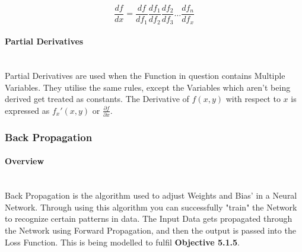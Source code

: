 \begin{flushleft}
                    \[
                        \frac{df}{dx} = \frac{df}{df_{1}} \frac{df_{1}}{df_{2}} \frac{df_{2}}{df_{3}} \hdots \frac{df_{n}}{df_{x}}
                    \]

                \paragraph{Partial Derivatives}  \mbox{} \\
                    \vspace{0.2cm}
                    Partial Derivatives are used when the Function in question contains Multiple Variables. They utilise the same rules, except the Variables
                    which aren't being derived get treated as constants. The Derivative of $f(x, y)$ with respect to $x$ is expressed as $f_{x}'(x,y)$ or 
                    {\Large $\frac{\partial f}{\partial x}$}. 
            \subsubsection{Back Propagation}
                \paragraph*{Overview} \mbox{} \\
                    Back Propagation is the algorithm used to adjust Weights and Bias' in a Neural Network. Through using this algorithm you can successfully "train"
                    the Network to recognize certain patterns in data. The Input Data gets propagated through the Network using Forward Propagation, and then the output
                    is passed into the Loss Function. This is being modelled to fulfil \textbf{Objective 5.1.5}.


\end{flushleft}
